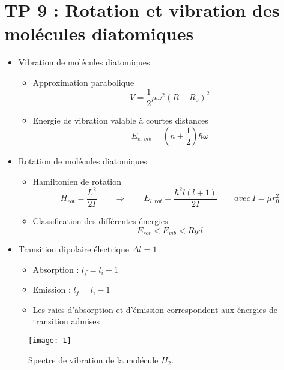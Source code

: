 
\section*{TP 9 : Rotation et vibration des molécules diatomiques}
\begin{itemize}
	
	\item Vibration de molécules diatomiques
		\begin{itemize}
			
			\item Approximation parabolique 
				\begin{equation}
				V = \frac{1}{2}\mu \omega ^2 (R-R_0)^2
				\end{equation}
					
			\item Energie de vibration valable à courtes distances 
				\begin{equation}
				E_{n,vib} = (n+\frac{1}{2})\hbar \omega
				\end{equation}
			\end{itemize}
		
		\item Rotation de molécules diatomiques
			
			\begin{itemize}
				\item Hamiltonien de rotation
					\begin{equation}
					H_{rot} = \frac{L^2}{2I} \qquad \Rightarrow \qquad E_{l,rot} = \frac{\hbar ^2 l(l+1)}{2I} \qquad avec \ I = \mu r_0 ^2
					\end{equation}
				
				\item Classification des différentes énergies
					\begin{equation}
					E_{rot} < E_{vib} < Ryd
					\end{equation}
			\end{itemize}
			
		\item Transition dipolaire électrique $\Delta l = 1$

			\begin{itemize}
				\item Absorption : $l_f = l_i + 1$
				\item Emission : $l_f = l_i - 1$
				\item Les raies d'absorption et d'émission correspondent aux énergies de transition admises
			\end{itemize}
\end{itemize}

\begin{figure}[h]
	\begin{center}
		\texttt{[image: 1]}
		\caption{Spectre de vibration de la molécule $H_2$.}
	\end{center}
\end{figure}